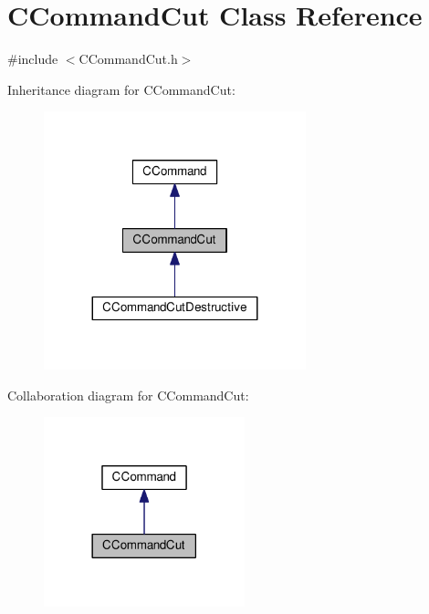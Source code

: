 \hypertarget{classCCommandCut}{}\section{C\+Command\+Cut Class Reference}
\label{classCCommandCut}


{\ttfamily \#include $<$C\+Command\+Cut.\+h$>$}



Inheritance diagram for C\+Command\+Cut\+:
\nopagebreak
\begin{figure}[H]
\begin{center}
\leavevmode
\includegraphics[width=215pt]{classCCommandCut__inherit__graph}
\end{center}
\end{figure}


Collaboration diagram for C\+Command\+Cut\+:\nopagebreak
\begin{figure}[H]
\begin{center}
\leavevmode
\includegraphics[width=165pt]{classCCommandCut__coll__graph}
\end{center}
\end{figure}
